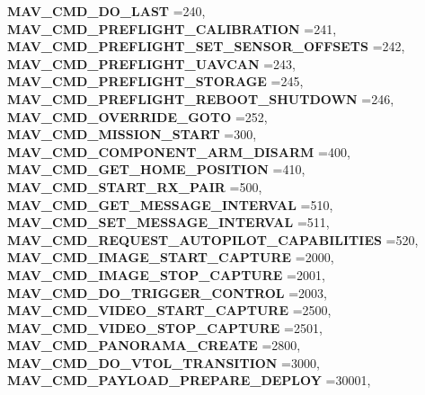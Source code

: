 \begin{DoxyCompactItemize}
\textbf{ M\+A\+V\+\_\+\+C\+M\+D\+\_\+\+D\+O\+\_\+\+L\+A\+ST} =240, 
\newline
\textbf{ M\+A\+V\+\_\+\+C\+M\+D\+\_\+\+P\+R\+E\+F\+L\+I\+G\+H\+T\+\_\+\+C\+A\+L\+I\+B\+R\+A\+T\+I\+ON} =241, 
\textbf{ M\+A\+V\+\_\+\+C\+M\+D\+\_\+\+P\+R\+E\+F\+L\+I\+G\+H\+T\+\_\+\+S\+E\+T\+\_\+\+S\+E\+N\+S\+O\+R\+\_\+\+O\+F\+F\+S\+E\+TS} =242, 
\textbf{ M\+A\+V\+\_\+\+C\+M\+D\+\_\+\+P\+R\+E\+F\+L\+I\+G\+H\+T\+\_\+\+U\+A\+V\+C\+AN} =243, 
\textbf{ M\+A\+V\+\_\+\+C\+M\+D\+\_\+\+P\+R\+E\+F\+L\+I\+G\+H\+T\+\_\+\+S\+T\+O\+R\+A\+GE} =245, 
\newline
\textbf{ M\+A\+V\+\_\+\+C\+M\+D\+\_\+\+P\+R\+E\+F\+L\+I\+G\+H\+T\+\_\+\+R\+E\+B\+O\+O\+T\+\_\+\+S\+H\+U\+T\+D\+O\+WN} =246, 
\textbf{ M\+A\+V\+\_\+\+C\+M\+D\+\_\+\+O\+V\+E\+R\+R\+I\+D\+E\+\_\+\+G\+O\+TO} =252, 
\textbf{ M\+A\+V\+\_\+\+C\+M\+D\+\_\+\+M\+I\+S\+S\+I\+O\+N\+\_\+\+S\+T\+A\+RT} =300, 
\textbf{ M\+A\+V\+\_\+\+C\+M\+D\+\_\+\+C\+O\+M\+P\+O\+N\+E\+N\+T\+\_\+\+A\+R\+M\+\_\+\+D\+I\+S\+A\+RM} =400, 
\newline
\textbf{ M\+A\+V\+\_\+\+C\+M\+D\+\_\+\+G\+E\+T\+\_\+\+H\+O\+M\+E\+\_\+\+P\+O\+S\+I\+T\+I\+ON} =410, 
\textbf{ M\+A\+V\+\_\+\+C\+M\+D\+\_\+\+S\+T\+A\+R\+T\+\_\+\+R\+X\+\_\+\+P\+A\+IR} =500, 
\textbf{ M\+A\+V\+\_\+\+C\+M\+D\+\_\+\+G\+E\+T\+\_\+\+M\+E\+S\+S\+A\+G\+E\+\_\+\+I\+N\+T\+E\+R\+V\+AL} =510, 
\textbf{ M\+A\+V\+\_\+\+C\+M\+D\+\_\+\+S\+E\+T\+\_\+\+M\+E\+S\+S\+A\+G\+E\+\_\+\+I\+N\+T\+E\+R\+V\+AL} =511, 
\newline
\textbf{ M\+A\+V\+\_\+\+C\+M\+D\+\_\+\+R\+E\+Q\+U\+E\+S\+T\+\_\+\+A\+U\+T\+O\+P\+I\+L\+O\+T\+\_\+\+C\+A\+P\+A\+B\+I\+L\+I\+T\+I\+ES} =520, 
\textbf{ M\+A\+V\+\_\+\+C\+M\+D\+\_\+\+I\+M\+A\+G\+E\+\_\+\+S\+T\+A\+R\+T\+\_\+\+C\+A\+P\+T\+U\+RE} =2000, 
\textbf{ M\+A\+V\+\_\+\+C\+M\+D\+\_\+\+I\+M\+A\+G\+E\+\_\+\+S\+T\+O\+P\+\_\+\+C\+A\+P\+T\+U\+RE} =2001, 
\textbf{ M\+A\+V\+\_\+\+C\+M\+D\+\_\+\+D\+O\+\_\+\+T\+R\+I\+G\+G\+E\+R\+\_\+\+C\+O\+N\+T\+R\+OL} =2003, 
\newline
\textbf{ M\+A\+V\+\_\+\+C\+M\+D\+\_\+\+V\+I\+D\+E\+O\+\_\+\+S\+T\+A\+R\+T\+\_\+\+C\+A\+P\+T\+U\+RE} =2500, 
\textbf{ M\+A\+V\+\_\+\+C\+M\+D\+\_\+\+V\+I\+D\+E\+O\+\_\+\+S\+T\+O\+P\+\_\+\+C\+A\+P\+T\+U\+RE} =2501, 
\textbf{ M\+A\+V\+\_\+\+C\+M\+D\+\_\+\+P\+A\+N\+O\+R\+A\+M\+A\+\_\+\+C\+R\+E\+A\+TE} =2800, 
\textbf{ M\+A\+V\+\_\+\+C\+M\+D\+\_\+\+D\+O\+\_\+\+V\+T\+O\+L\+\_\+\+T\+R\+A\+N\+S\+I\+T\+I\+ON} =3000, 
\newline
\textbf{ M\+A\+V\+\_\+\+C\+M\+D\+\_\+\+P\+A\+Y\+L\+O\+A\+D\+\_\+\+P\+R\+E\+P\+A\+R\+E\+\_\+\+D\+E\+P\+L\+OY} =30001, 

\end{DoxyCompactItemize}
